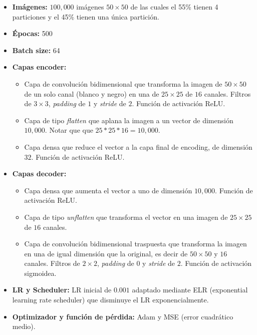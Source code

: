 \begin{itemize}
    \setlength{\itemsep}{0pt}
    \item[-] \textbf{Imágenes:} $100,000$ imágenes $50\times 50$ de las cuales el 55\% tienen 4 particiones y el 45\% tienen una única partición.
    \item[-] \textbf{Épocas:} 500
    \item[-] \textbf{Batch size:} 64
    \item[-] \textbf{Capas encoder:}
            \begin{itemize}
            \setlength{\itemsep}{0pt}
                \item Capa de convolución bidimensional que transforma la imagen de $50\times 50$ de un solo canal (blanco y negro) en una de $25\times 25$ de $16$ canales. Filtros de $3\times 3$, \textit{padding} de $1$ y \textit{stride} de $2$. Función de activación ReLU.
                \item Capa de tipo \textit{flatten} que aplana la imagen a un vector de dimensión $10,000$. Notar que  que $25*25*16=10,000$.
                \item Capa densa que reduce el vector a la capa final de encoding, de dimensión $32$. Función de activación ReLU.
            \end{itemize}
    \item[-] \textbf{Capas decoder:}
            \begin{itemize}
            \setlength{\itemsep}{0pt}
                \item Capa densa que aumenta el vector a uno de dimensión $10,000$. Función de activación ReLU.
                \item Capa de tipo \textit{unflatten} que transforma el vector en una imagen de $25\times 25$ de $16$ canales.
                \item Capa de convolución bidimensional traspuesta que transforma la imagen en una de igual dimensión que la original, es decir de $50\times 50$ y $16$ canales. Filtros de $2\times 2$, \textit{padding} de $0$ y \textit{stride} de $2$. Función de activación sigmoidea.
            \end{itemize}
    \item[-] \textbf{LR y Scheduler:} LR inicial de $0.001$ adaptado mediante ELR (exponential learning rate scheduler) que disminuye el LR exponencialmente.
    \item[-] \textbf{Optimizador y función de pérdida:} Adam y MSE (error cuadrático medio).
\end{itemize}

